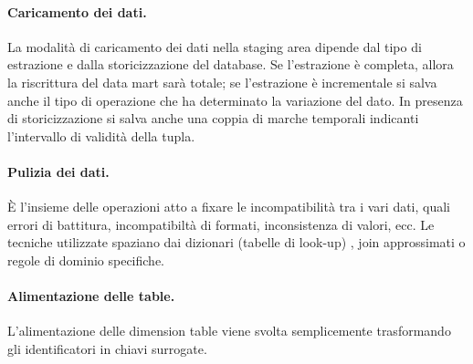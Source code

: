 \documentclass[a4paper, 10pt]{article}
\begin{document}
	\paragraph{Caricamento dei dati.} La modalità di caricamento dei dati nella staging area dipende dal tipo di estrazione e dalla storicizzazione del database. Se l'estrazione è completa, allora la riscrittura del data mart sarà totale; se l'estrazione è incrementale si salva anche il tipo di operazione che ha determinato la variazione del dato. In presenza di storicizzazione si salva anche una coppia di marche temporali indicanti l'intervallo di validità della tupla.
	
	\paragraph{Pulizia dei dati.} È l'insieme delle operazioni atto a fixare le incompatibilità tra i vari dati, quali errori di battitura, incompatibiltà di formati, inconsistenza di valori, ecc. Le tecniche utilizzate spaziano dai dizionari (tabelle di look-up) , join approssimati o regole di dominio specifiche.
	
	\paragraph{Alimentazione delle table.} L'alimentazione delle dimension table viene svolta semplicemente trasformando gli identificatori in chiavi surrogate. 
	
	

	
	
	
	
	
	
	
	
	
	
	
\end{document}
